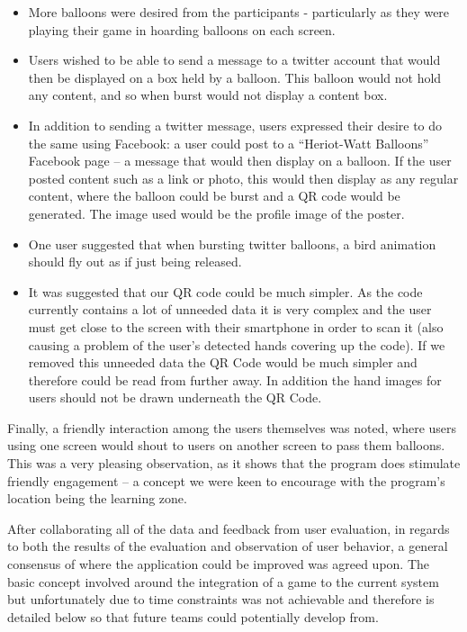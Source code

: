 \begin{itemize}
	\item More balloons were desired from the participants - particularly as they were playing their game in hoarding balloons on each screen.
	\item Users wished to be able to send a message to a twitter account that would then be displayed on a box held by a balloon. This balloon would not hold any content, and so when burst would not display a content box.
	\item In addition to sending a twitter message, users expressed their desire to do the same using Facebook: a user could post to a ``Heriot-Watt Balloons'' Facebook page -- a message that would then display on a balloon. If the user posted content such as a link or photo, this would then display as any regular content, where the balloon could be burst and a QR code would be generated. The image used would be the profile image of the poster.
	\item One user suggested that when bursting twitter balloons, a bird animation should fly out as if just being released.
	\item It was suggested that our QR code could be much simpler. As the code currently contains a lot of unneeded data it is very complex and the user must get close to the screen with their smartphone in order to scan it (also causing a problem of the user's detected hands covering up the code). If we removed this unneeded data the QR Code would be much simpler and therefore could be read from further away. In addition the hand images for users should not be drawn underneath the QR Code. 
\end{itemize}

Finally, a friendly interaction among the users themselves was noted, where users using one screen would shout to users on another screen to pass them balloons. This was a very pleasing observation, as it shows that the program does stimulate friendly engagement -- a concept we were keen to encourage with the program's location being the learning zone.

\clearpage{}



\clearpage{}


After collaborating all of the data and feedback from user evaluation, in regards to both the results of the evaluation and observation of user behavior, a general consensus of where the application could be improved was agreed upon. The basic concept involved around the integration of a game to the current system but unfortunately due to time constraints was not achievable and therefore is detailed below so that future teams could potentially develop from.

